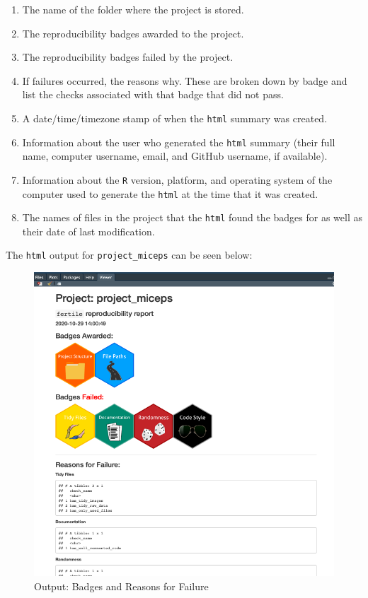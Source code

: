 \documentclass[12pt,twoside]{reedthesis}
\providecommand{\tightlist}{%
  \setlength{\itemsep}{0pt}\setlength{\parskip}{0pt}}
\begin{document}
\begin{enumerate}
\def\labelenumi{\arabic{enumi}.}
\tightlist
\item
  The name of the folder where the project is stored.
\item
  The reproducibility badges awarded to the project.
\item
  The reproducibility badges failed by the project.
\item
  If failures occurred, the reasons why. These are broken down by badge and list the checks associated with that badge that did not pass.
\item
  A date/time/timezone stamp of when the \texttt{html} summary was created.
\item
  Information about the user who generated the \texttt{html} summary (their full name, computer username, email, and GitHub username, if available).
\item
  Information about the \texttt{R} version, platform, and operating system of the computer used to generate the \texttt{html} at the time that it was created.
\item
  The names of files in the project that the \texttt{html} found the badges for as well as their date of last modification.
\end{enumerate}
The \texttt{html} output for \texttt{project\_miceps} can be seen below:
\begin{figure}
\includegraphics[width=1\linewidth]{figure/badges-1} \caption{Output: Badges and Reasons for Failure}\label{fig:badges-1}
\end{figure}
\end{document}
